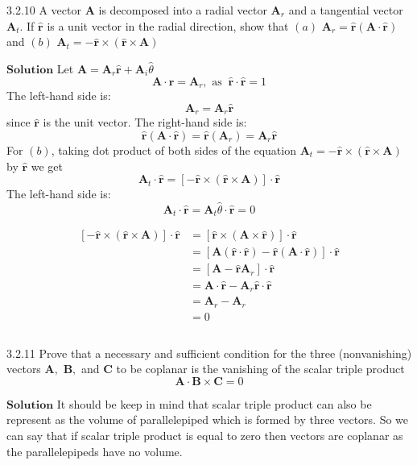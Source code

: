 \documentclass{article}
\begin{document}
\begin{flushleft}
\newpage


\begin{mybox}{3.2.10}
A vector $\mathbf{A}$ is decomposed into a radial vector $\mathbf{A}_{r}$ and a tangential vector $\mathbf{A}_{t} .$ If $\hat{\mathbf{r}}$ is a unit vector in the radial direction, show that
$(a)$ $\mathbf{A}_{r}=\hat{\mathbf{r}}(\mathbf{A} \cdot \hat{\mathbf{r}})$ and
$(b)$ $\mathbf{A}_{t}=-\hat{\mathbf{r}} \times(\hat{\mathbf{r}} \times \mathbf{A})$
\end{mybox}


$\boxed{\textbf{Solution}}$ Let $\mathbf{A}=\mathbf{A}_{r} \hat{\mathbf{r}}+\mathbf{A}_{i} \hat{\theta}$
$$
\mathbf{A} \cdot \hat{\mathbf{r}}=\mathbf{A}_{r}, \text { as } \ \hat{\mathbf{r}} \cdot \hat{\mathbf{r}}=1
$$
The left-hand side is:
$$\mathbf{A}_{r}=\mathbf{A}_{r} \hat{\mathbf{r}}$$ since $\hat{\mathbf{r}}$ is the unit vector.
The right-hand side is:
$$
\hat{\mathbf{r}}(\mathbf{A} \cdot \hat{\mathbf{r}})=\hat{\mathbf{r}}\left(\mathbf{A}_{r}\right)=\mathbf{A}_{r} \hat{\mathbf{r}}
$$
For $(b)$, taking dot product of both sides of the equation $\mathbf{A}_{t}=-\hat{\mathbf{r}} \times(\hat{\mathbf{r}} \times \mathbf{A})$ by $\hat{\mathbf{r}}$ we get
$$
\mathbf{A}_{t} \cdot \hat{\mathbf{r}}=[-\hat{\mathbf{r}} \times(\hat{\mathbf{r}} \times \mathbf{A})] \cdot \hat{\mathbf{r}}
$$
The left-hand side is:
$$
\mathbf{A}_{t} \cdot \hat{\mathbf{r}}=\mathbf{A}_{t} \hat{\theta} \cdot \hat{\mathbf{r}}=0
$$

$$
\begin{aligned}
[-\hat{\mathbf{r}} \times(\hat{\mathbf{r}} \times \mathbf{A})] \cdot \hat{\mathbf{r}}&=[\hat{\mathbf{r}} \times(\mathbf{A} \times \hat{\mathbf{r}})] \cdot \hat{\mathbf{r}} \\
&=[\mathbf{A}(\hat{\mathbf{r}} \cdot \hat{\mathbf{r}})-\hat{\mathbf{r}}(\mathbf{A} \cdot \hat{\mathbf{r}})] \cdot \hat{\mathbf{r}} \\
&=\left[\mathbf{A}-\hat{\mathbf{r}} \mathbf{A}_{r}\right] \cdot \hat{\mathbf{r}} \\
&=\mathbf{A} \cdot \hat{\mathbf{r}}-\mathbf{A}_{r} \hat{\mathbf{r}} \cdot \hat{\mathbf{r}} \\
&=\mathbf{A}_{r}-\mathbf{A}_{r}\\
&=0
\end{aligned}
$$

$$$$

\begin{mybox}{3.2.11}
Prove that a necessary and sufficient condition for the three (nonvanishing) vectors $\mathbf{A},$ $\mathbf{B},$ and $\mathbf{C}$ to be coplanar is the vanishing of the scalar triple product
$$
\mathbf{A} \cdot \mathbf{B} \times \mathbf{C}=0
$$
\end{mybox}
$\boxed{\textbf{Solution}}$ It should be keep in mind that scalar triple product can also be represent as the volume of
parallelepiped which is formed by three vectors. So we can say that if scalar triple product is equal to zero then vectors are coplanar as the parallelepipeds have no volume.


\end{flushleft}
\end{document}
